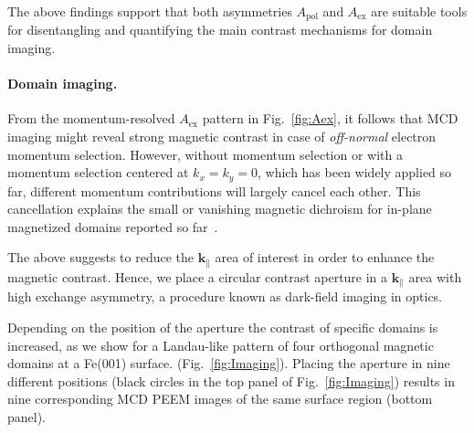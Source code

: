 \documentclass[prl,twocolumn,floatfix,superscriptaddress,aps]{revtex4-2}
\renewcommand{\vec}[1]{\boldsymbol{#1}}
\begin{document}
The above findings support that both asymmetries $A_{\mathrm{pol}}$ and $A_{\mathrm{ex}}$ are suitable tools for disentangling and quantifying the main contrast mechanisms for domain imaging. 

\paragraph{Domain imaging.} From the momentum-resolved $A_{\mathrm{ex}}$ pattern in Fig.~\ref{fig:Aex}, it follows that MCD imaging might reveal strong magnetic contrast in case of \emph{off-normal} electron momentum selection. However, without momentum selection or with a momentum selection centered at $k_x = k_y = 0$, which has been widely applied so far, different momentum contributions will largely cancel each other. This cancellation explains the small or vanishing magnetic dichroism for in-plane magnetized domains reported so far~\cite{marx2000}.

The above suggests to reduce the $\vec{k}_{\parallel}$ area of interest in order to enhance the magnetic contrast. Hence, we place a circular contrast aperture in a $\vec{k}_{\parallel}$ area with high exchange asymmetry, a procedure known as dark-field imaging in optics. 

Depending on the position of the aperture the contrast of specific domains is increased, as we show for a Landau-like pattern of four orthogonal magnetic domains at a Fe(001) surface. (Fig.~\ref{fig:Imaging}). Placing the aperture in nine different positions (black circles in the top panel of Fig.~\ref{fig:Imaging})  results in nine corresponding MCD PEEM images of the same surface region (bottom panel). 
\end{document}
